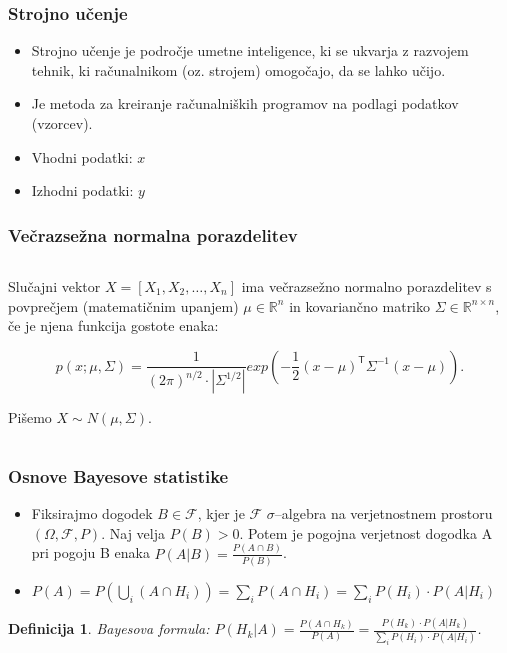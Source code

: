 \documentclass{beamer}
\newtheorem{proposition}[theorem]{Definicija}
\begin{document}
\begin{frame}\frametitle{Strojno učenje}
\begin{itemize}
\item Strojno učenje je področje umetne inteligence, ki se ukvarja z razvojem tehnik, ki računalnikom (oz. strojem) omogočajo, da se lahko učijo.
\item Je metoda za kreiranje računalniških programov na podlagi podatkov (vzorcev).
\item Vhodni podatki: $ x$
\item Izhodni podatki: $y$
\end{itemize}
\end{frame}
\begin{frame}
  \frametitle{Večrazsežna normalna porazdelitev}


\begin{columns}
\begin{column}{10cm}
Slučajni vektor  $ X = [X_{1}, X_{2}, \ldots, X_{n}] $  ima večrazsežno normalno porazdelitev s povprečjem (matematičnim upanjem) $ \mu \in \mathbb{R}^{n} $
 in kovariančno matriko $\Sigma \in \mathbb{R}^{n \times n} $, če je njena funkcija gostote enaka:

 
  $$ p(x; \mu , \Sigma) = \frac{1}{ (2 \pi)^{n/2}       \cdot     \left| \Sigma^{1/2} \right|    } 
   exp \left(  - \frac{1}{2} (x- \mu)^\mathsf{T} \Sigma^{-1}(x-\mu) \right).
  $$
 
Pišemo $ X \sim N(\mu, \Sigma) $. 

\end{column}
\end{columns}
\end{frame}
\begin{frame}\frametitle{Osnove Bayesove statistike}
\begin{itemize}

\item  Fiksirajmo dogodek $ B \in \mathcal{F}$, kjer je $\mathcal{F}$  $\sigma$--algebra na verjetnostnem prostoru $(\Omega, \mathcal{F}, P)$. Naj velja $P(B)>0$. Potem je pogojna verjetnost dogodka A pri pogoju B enaka $P(A|B) = \frac{P(A \cap B)}{P(B)} $.

\item $ P(A) = P( \bigcup\limits_{i} (A \cap H_{i})) = \sum\limits_{i} P(A \cap H_{i}) = \sum\limits_{i} P(H_{i}) \cdot P(A|H_{i})$

\end{itemize}

\begin{proposition} 
\alert{Bayesova formula:}  $P(H_{k} | A) =\frac{ P(A \cap H_{k}) }{P(A)} =  \frac{ P(H_{k}) \cdot  P(A| H_{k})}{ \sum\limits_{i} P(H_{i}) \cdot P(A|H_{i})} $. 
\end{proposition}
\end{frame}
\end{document}
